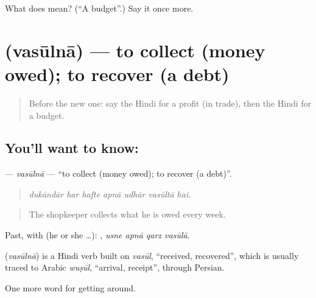 \begin{tcolorbox}[breakable,colback=teal!4,colframe=teal!35!black,title={Before you move on}]
What does  mean? (\textquotedblleft{}A budget\textquotedblright{}.) Say it once more.
\end{tcolorbox}
\section[\texorpdfstring{\hi{वसूलना} (vasūlnā)}{वसूलना (vasūlnā)}]{ (vasūlnā) — to collect (money owed); to recover (a debt)}

\label{lesson:HI-C428-vasulna}



\begin{quote}
Before the new one: say the Hindi for a profit (in trade), then the Hindi for a budget.
\end{quote}

\subsection*{You'll want to know: }
\textbf{} — \emph{vasūlnā} — \textquotedblleft{}to collect (money owed); to recover (a debt)\textquotedblright{}.

\begin{quote}
      
\end{quote}

\begin{quote}
\emph{dukāndār har hafte apnā udhār vasūltā hai.}
\end{quote}

\begin{quote}
The shopkeeper collects what he is owed every week.
\end{quote}

Past, with  (he or she …):    , \emph{usne apnā qarz vasūlā}.

\begin{cousinweb}
\textbf{} (\emph{vasūlnā}) is a Hindi verb built on \emph{vasūl}, \textquotedblleft{}received, recovered\textquotedblright{}, which is usually traced to Arabic \emph{wuṣūl}, \textquotedblleft{}arrival, receipt\textquotedblright{}, through Persian.
\end{cousinweb}

\begin{grammarlens}[title={What you've built}]
One more word for getting around.
\end{grammarlens}

